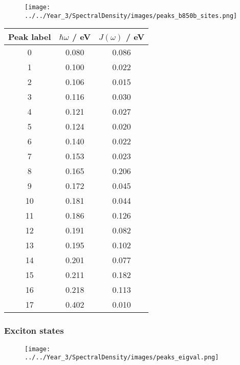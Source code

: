 \begin{figure}
    \centering
    \texttt{[image: ../../Year\_3/SpectralDensity/images/peaks\_b850b\_sites.png]}
\end{figure}

\begin{table}
    \centering
    \begin{tabular}{||c c c||}
    \hline
    Peak label & $\hbar \omega$ / eV & $J\left(\omega\right)$ / eV \\
    \hline\hline
    
     0 & 0.080 & 0.086 \\
     1 & 0.100 & 0.022 \\
     2 & 0.106 & 0.015 \\
     3 & 0.116 & 0.030 \\
     4 & 0.121 & 0.027 \\
     5 & 0.124 & 0.020 \\
     6 & 0.140 & 0.022 \\
     7 & 0.153 & 0.023 \\
     8 & 0.165 & 0.206 \\
     9 & 0.172 & 0.045 \\
     10 & 0.181 & 0.044 \\
     11 & 0.186 & 0.126 \\
     12 & 0.191 & 0.082 \\
     13 & 0.195 & 0.102 \\
     14 & 0.201 & 0.077 \\
     15 & 0.211 & 0.182 \\
     16 & 0.218 & 0.113 \\
     17 & 0.402 & 0.010 \\
    \hline 
    \end{tabular}
\end{table}

\afterpartskip
\subsubsection{Exciton states}
\label{subsubsec:specdens_eigval}

\begin{figure}
    \centering
    \texttt{[image: ../../Year\_3/SpectralDensity/images/peaks\_eigval.png]}
\end{figure}


